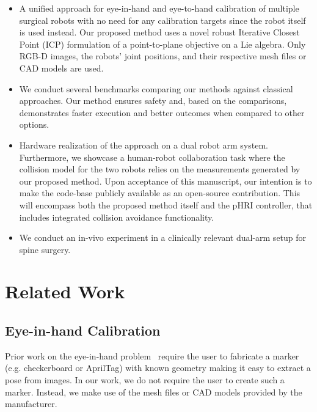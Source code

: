 \begin{itemize}
    \item A unified approach for eye-in-hand and eye-to-hand calibration of multiple surgical robots with no need for any calibration targets since the robot itself is used instead. Our proposed method uses a novel robust Iterative Closest Point (ICP) formulation of a point-to-plane objective on a Lie algebra. Only RGB-D images, the robots' joint positions, and their respective mesh files or CAD models are used.
    \item We conduct several benchmarks comparing our methods against classical approaches. Our method ensures safety and, based on the comparisons, demonstrates faster execution and better outcomes when compared to other options.
    \item Hardware realization of the approach on a dual robot arm system. Furthermore, we showcase a human-robot collaboration task where the collision model for the two robots relies on the measurements generated by our proposed method. Upon acceptance of this manuscript, our intention is to make the code-base publicly available as an open-source contribution. This will encompass both the proposed method itself and the pHRI controller, that includes integrated collision avoidance functionality.
    \item We conduct an in-vivo experiment in a clinically relevant dual-arm setup for spine surgery.
\end{itemize}




\section{Related Work}
\subsection{Eye-in-hand Calibration}
Prior work on the eye-in-hand problem~\cite{Horaud95, Strobl06} require the user to fabricate a marker (e.g. checkerboard or AprilTag\cite{Olson11}) with known geometry making it easy to extract a pose from images. In our work, we do not require the user to create such a marker.
Instead, we make use of the mesh files or CAD models provided by the manufacturer.

